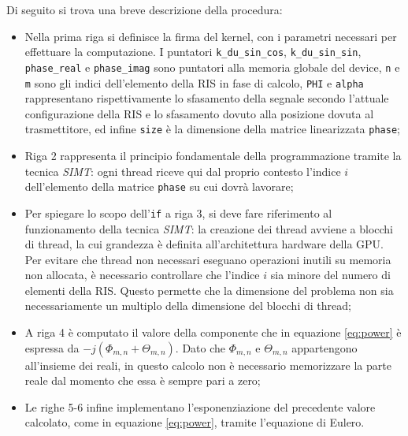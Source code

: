 

Di seguito si trova una breve descrizione della procedura:

\begin{itemize}
  \item Nella prima riga si definisce la firma del kernel, con i parametri
    necessari per effettuare la computazione. I puntatori \texttt{k\_du\_sin\_cos},
    \texttt{k\_du\_sin\_sin}, \texttt{phase\_real} e \texttt{phase\_imag} sono puntatori
    alla memoria globale del device, \texttt{n} e \texttt{m} sono gli indici
    dell'elemento della RIS in fase di calcolo, \texttt{PHI} e \texttt{alpha} rappresentano
    rispettivamente lo sfasamento della segnale secondo l'attuale configurazione
    della RIS e lo sfasamento dovuto alla posizione dovuta al trasmettitore, ed
    infine \texttt{size} è la dimensione della matrice linearizzata \texttt{phase};

  \item Riga 2 rappresenta il principio fondamentale della programmazione tramite
    la tecnica \textit{SIMT}: ogni thread riceve qui dal proprio contesto l'indice
    $i$ dell'elemento della matrice \texttt{phase} su cui dovrà lavorare;

  \item Per spiegare lo scopo dell'\texttt{if} a riga 3, si deve fare riferimento
    al funzionamento della tecnica \textit{SIMT}: la creazione dei thread avviene
    a blocchi di thread, la cui grandezza è definita all'architettura hardware
    della GPU. Per evitare che thread non necessari eseguano operazioni inutili su
    memoria non allocata, è necessario controllare che l'indice $i$ sia minore
    del numero di elementi della RIS. Questo permette che la dimensione del problema
    non sia necessariamente un multiplo della dimensione del blocchi di thread;

  \item A riga 4 è computato il valore della componente che in equazione \ref{eq:power}
    è espressa da $-j(\Phi_{m,n}+\Theta_{m,n})$. Dato che $\Phi_{m,n}$ e
    $\Theta_{m,n}$ appartengono all'insieme dei reali, in questo calcolo non è necessario
    memorizzare la parte reale dal momento che essa è sempre pari a zero;

  \item Le righe 5-6 infine implementano l'esponenziazione del precedente valore
    calcolato, come in equazione \ref{eq:power}, tramite l'equazione di Eulero.
\end{itemize}

